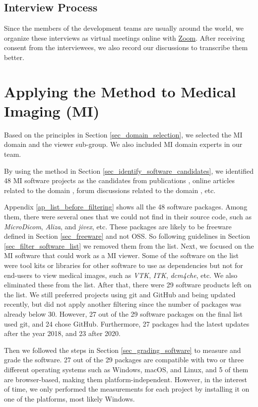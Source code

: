 \subsection{Interview Process}
Since the members of the development teams are usually around the world, we organize these interviews as virtual meetings online with \hyperlink{https://zoom.us/}{Zoom}. After receiving consent from the interviewees, we also record our discussions to transcribe them better.

\section{Applying the Method to Medical Imaging (MI)}
\label{sec_applying_method}

Based on the principles in Section \ref{sec_domain_selection}, we selected the MI domain and the viewer sub-group. We also included MI domain experts in our team.

By using the method in Section \ref{sec_identify_software_candidates}, we identified 48 MI software projects as the candidates from publications \cite{Bjorn2017} \cite{Bruhschwein2019} \cite{Haak2015}, online articles related to the domain \cite{Emms2019} \cite{Hasan2020} \cite{Mu2019}, forum discussions related to the domain \cite{Samala2014}, etc.

Appendix \ref{ap_list_before_filtering} shows all the 48 software packages. Among them, there were several ones that we could not find in their source code, such as \textit{MicroDicom}, \textit{Aliza}, and \textit{jivex}, etc. These packages are likely to be freeware defined in Section \ref{sec_freeware} and not OSS. So following guidelines in Section \ref{sec_filter_software_list} we removed them from the list. Next, we focused on the MI software that could work as a MI viewer. Some of the software on the list were tool kits or libraries for other software to use as dependencies but not for end-users to view medical images, such as \textit{VTK}, \textit{ITK}, \textit{dcm4che}, etc. We also eliminated these from the list. After that, there were 29 software products left on the list. We still preferred projects using git and GitHub and being updated recently, but did not apply another filtering since the number of packages was already below 30. However, 27 out of the 29 software packages on the final list used git, and 24 chose GitHub. Furthermore, 27 packages had the latest updates after the year 2018, and 23 after 2020.

Then we followed the steps in Section \ref{sec_grading_software} to measure and grade the software. 27 out of the 29 packages are compatible with two or three different operating systems such as Windows, macOS, and Linux, and 5 of them are browser-based, making them platform-independent. However, in the interest of time, we only performed the measurements for each project by installing it on one of the platforms, most likely Windows.

